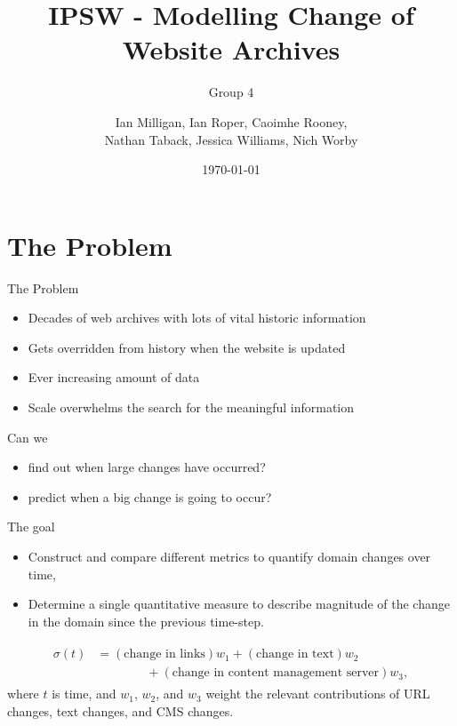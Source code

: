 \documentclass[10pt]{beamer}
\title{IPSW - Modelling Change of Website Archives}
\subtitle{Group 4}
\date{\today}
\author{Ian Milligan, Ian Roper, Caoimhe Rooney, \\Nathan Taback, Jessica Williams, Nich Worby}
\begin{document}
\maketitle


\section{The Problem}

\begin{frame}{The Problem}

\begin{itemize}
\item Decades of web archives with lots of vital historic information 
\item Gets overridden from history when the website is updated
\item Ever increasing amount of data
\item Scale overwhelms the search for the meaningful information
\end{itemize}

\pause

\vspace{10mm}

Can we
\begin{itemize}
\item find out when large changes have occurred?
\item predict when a big change is going to occur?
\end{itemize}

\end{frame}

\begin{frame}[fragile]{The goal}

\begin{itemize}
	\item Construct and compare different metrics to quantify domain changes over time,
	\item Determine a single quantitative measure to describe magnitude of the change in the domain since the previous time-step.
	\end{itemize} 
\begin{align}
	\begin{split}
		\sigma(t) &= (\text{change in links})w_1 + (\text{change in text})w_2 \\
		&\qquad\qquad+ (\text{change in content management server})w_3,
	\end{split}
\end{align}
where $t$ is time, and $w_1$, $w_2$, and $w_3$ weight the relevant contributions of URL changes, text changes, and CMS changes.
\end{frame}
\end{document}
